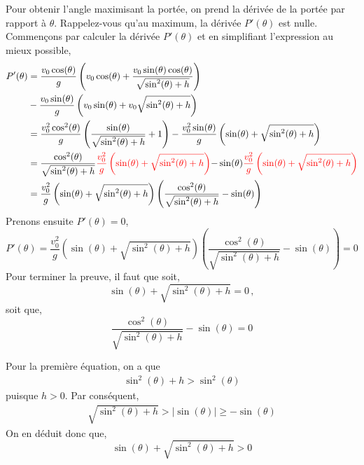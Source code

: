 \documentclass[titlepage]{article}
\theoremstyle{cleanremark}
\begin{document}
Pour obtenir l'angle maximisant la portée, on prend la dérivée de la portée par rapport à $\theta$. Rappelez-vous qu'au maximum, la dérivée $P'(\theta)$ est nulle.
Commençons par calculer la dérivée $P'(\theta)$ et en simplifiant l'expression au mieux possible,
\begin{align}
    P'(\theta) &= \frac{v_0\cos(\theta)}{g}\left(v_0\cos(\theta) + \frac{v_0\sin(\theta)\cos(\theta)}{\sqrt{\sin^2(\theta)+h}} \right)
    \\
    &-\frac{v_0 \sin(\theta)}{g}\left(v_0\sin(\theta) + v_0\sqrt{\sin^2(\theta) + h}\right)
    \\
    &= \frac{v^2_0\cos^2(\theta)}{g} \left(\frac{\sin(\theta)}{\sqrt{\sin^2(\theta)+h}} + 1\right) - \frac{v_0^2\sin(\theta)}{g}\left(\sin(\theta) + \sqrt{\sin^2(\theta) + h}\right)
    \\
    &= \frac{\cos^2(\theta)}{\sqrt{\sin^2(\theta)+h}} \color{red}{\frac{v_0^2}{g}\left(\sin(\theta)+\sqrt{\sin^2(\theta)+h}\right)}\color{black}{-\sin(\theta)} \color{red}{\frac{v_0^2}{g}\left(\sin(\theta)+\sqrt{\sin^2(\theta)+h}\right)}
    \\
    &= \frac{v_0^2}{g}\left(\sin(\theta)+\sqrt{\sin^2(\theta)+h}\right) \left(\frac{\cos^2(\theta)}{\sqrt{\sin^2(\theta)+h}} - \sin(\theta)\right)
\end{align}
Prenons ensuite $P'(\theta)=0$, 
\begin{equation}
        P'(\theta)= \frac{v_0^2}{g}\left(\sin(\theta)+\sqrt{\sin^2(\theta)+h}\right) \left(\frac{\cos^2(\theta)}{\sqrt{\sin^2(\theta)+h}} - \sin(\theta)\right)=0
\end{equation}
Pour terminer la preuve, il faut que soit, 
\begin{equation}
\sin(\theta) + \sqrt{\sin^2(\theta)+h} = 0\, ,
\end{equation}
soit que, 
\begin{equation}
    \frac{\cos^2(\theta)}{\sqrt{\sin^2(\theta)+h}}-\sin(\theta) = 0
\end{equation}

\noindent Pour la première équation, on a que 
\begin{align}
    \sin^2(\theta) + h > \sin^2(\theta) 
\end{align}
puisque $h>0$. Par conséquent, 
\begin{align}
    \sqrt{\sin^2(\theta)+h}>\lvert \sin(\theta)\rvert\geq -\sin(\theta) 
\end{align}
On en déduit donc que,
\begin{equation}
    \sin(\theta) + \sqrt{\sin^2(\theta)+h}>0
\end{equation}
\end{document}
